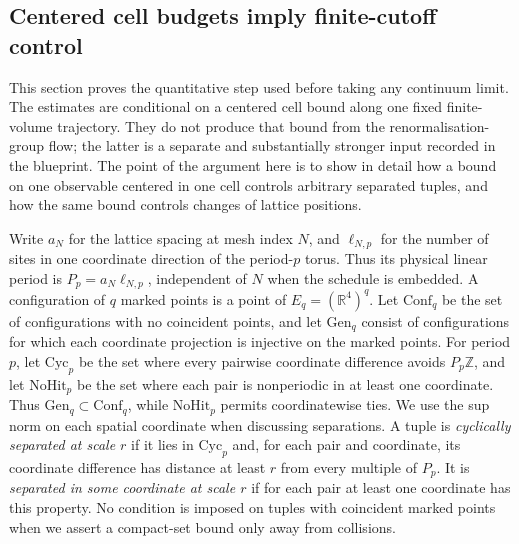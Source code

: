 \subsection{Centered cell budgets imply finite-cutoff control}\label{ex-centered-estimates}

This section proves the quantitative step used before taking any continuum limit. The estimates are conditional on a centered cell bound along one fixed finite-volume trajectory. They do not produce that bound from the renormalisation-group flow; the latter is a separate and substantially stronger input recorded in the blueprint. The point of the argument here is to show in detail how a bound on one observable centered in one cell controls arbitrary separated tuples, and how the same bound controls changes of lattice positions.

Write $a_N$ for the lattice spacing at mesh index $N$, and $\ell_{N,p}$ for the number of sites in one coordinate direction of the period-$p$ torus. Thus its physical linear period is $P_p=a_N\ell_{N,p}$, independent of $N$ when the schedule is embedded. A configuration of $q$ marked points is a point of $E_q=(\mathbb R^4)^q$. Let $\mathrm{Conf}_q$ be the set of configurations with no coincident points, and let $\mathrm{Gen}_q$ consist of configurations for which each coordinate projection is injective on the marked points. For period $p$, let $\mathrm{Cyc}_p$ be the set where every pairwise coordinate difference avoids $P_p\mathbb Z$, and let $\mathrm{NoHit}_p$ be the set where each pair is nonperiodic in at least one coordinate. Thus $\mathrm{Gen}_q\subset\mathrm{Conf}_q$, while $\mathrm{NoHit}_p$ permits coordinatewise ties. We use the sup norm on each spatial coordinate when discussing separations. A tuple is \emph{cyclically separated at scale $r$} if it lies in $\mathrm{Cyc}_p$ and, for each pair and coordinate, its coordinate difference has distance at least $r$ from every multiple of $P_p$. It is \emph{separated in some coordinate at scale $r$} if for each pair at least one coordinate has this property. No condition is imposed on tuples with coincident marked points when we assert a compact-set bound only away from collisions.

